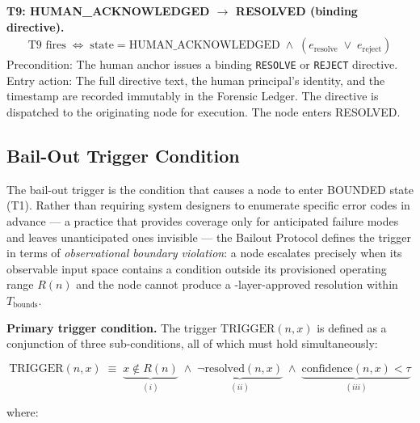 \bigskip
\noindent\textbf{T9: HUMAN\_ACKNOWLEDGED $\rightarrow$ RESOLVED (binding directive).}
\begin{align}
\text{T9 fires} \;\iff\; \text{state} = \text{HUMAN\_ACKNOWLEDGED} \;\land\; (e_{\text{resolve}} \;\lor\; e_{\text{reject}}) \tag{T9}
\end{align}
Precondition: The human anchor issues a binding \texttt{RESOLVE} or \texttt{REJECT} directive. Entry action: The full directive text, the human principal's identity, and the timestamp are recorded immutably in the Forensic Ledger. The directive is dispatched to the originating node for execution. The node enters RESOLVED.

\subsection{Bail-Out Trigger Condition}\label{sec:bailout-trigger}

The bail-out trigger is the condition that causes a node to enter BOUNDED state (T1). Rather than requiring system designers to enumerate specific error codes in advance — a practice that provides coverage only for anticipated failure modes and leaves unanticipated ones invisible — the Bailout Protocol defines the trigger in terms of \emph{observational boundary violation}: a node escalates precisely when its observable input space contains a condition outside its provisioned operating range $R(n)$ and the node cannot produce a \fact-layer-approved resolution within $T_{\text{bounds}}$.

\bigskip
\noindent\textbf{Primary trigger condition.} The trigger $\text{TRIGGER}(n, x)$ is defined as a conjunction of three sub-conditions, all of which must hold simultaneously:

\begin{equation}
\text{TRIGGER}(n, x) \;\equiv\; \underbrace{x \notin R(n)}_{(i)} \;\land\; \underbrace{\neg\text{resolved}(n, x)}_{(ii)} \;\land\; \underbrace{\text{confidence}(n, x) < \tau}_{(iii)} \tag{TC}
\end{equation}

where:

